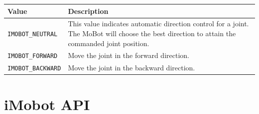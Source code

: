 \documentclass[11pt]{report}
\begin{document}
\begin{tabular}{p{3cm}p{7cm}} \hline 
Value & Description \\
\hline 
\texttt{IMOBOT\_NEUTRAL} & This value indicates automatic direction control for a joint. 
The MoBot will choose the best direction to attain the commanded joint position. \\
\texttt{IMOBOT\_FORWARD} & Move the joint in the forward direction. \\
\texttt{IMOBOT\_BACKWARD} & Move the joint in the backward direction. \\
\end{tabular}

\chapter{iMobot API}

\pagebreak

{}
\printindex
\end{document}
